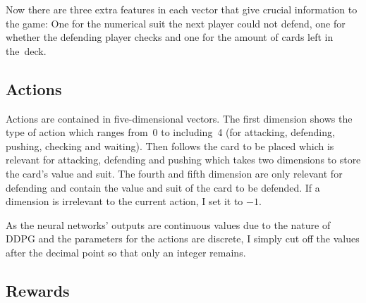 \documentclass[a4paper,titlepage]{article}
\begin{document}
Now there are three extra features in each vector that give crucial information to the game: One for the numerical suit the next player could not defend, one for whether the defending player checks and one for the amount of cards left in the~deck.

\subsection{Actions}

Actions are contained in five-dimensional vectors. The first dimension shows the type of action which ranges from~0 to including~4 (for attacking, defending, pushing, checking and waiting). Then follows the card to be placed which is relevant for attacking, defending and pushing which takes two dimensions to store the card's value and suit. The fourth and fifth dimension are only relevant for defending and contain the value and suit of the card to be defended. If a dimension is irrelevant to the current action, I set it to $-1$.

As the neural networks' outputs are continuous values due to the nature of DDPG and the parameters for the actions are discrete, I simply cut off the values after the decimal point so that only an integer remains.

\subsection{Rewards}
\label{sec:rewards}
\end{document}

